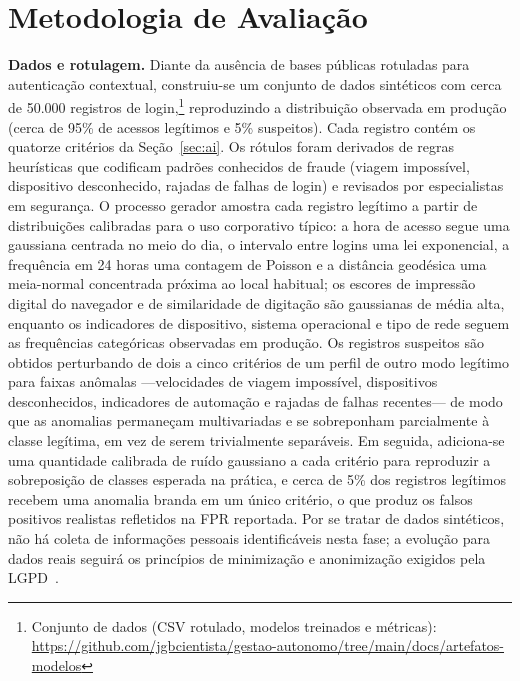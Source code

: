 \documentclass[conference]{IEEEtran}
\begin{document}
\section{Metodologia de Avaliação}
\label{sec:method}
\textbf{Dados e rotulagem.} Diante da ausência de bases públicas
rotuladas para autenticação contextual, construiu-se um conjunto de dados
sintéticos com cerca de 50.000 registros de login,\footnote{Conjunto de dados (CSV rotulado, modelos treinados e métricas): \url{https://github.com/jgbcientista/gestao-autonomo/tree/main/docs/artefatos-modelos}} reproduzindo a
distribuição observada em produção (cerca de 95\% de acessos legítimos e
5\% suspeitos). Cada registro contém os quatorze critérios da
Seção~\ref{sec:ai}. Os rótulos foram derivados de regras heurísticas que
codificam padrões conhecidos de fraude (viagem impossível, dispositivo
desconhecido, rajadas de falhas de login) e revisados por especialistas
em segurança. O processo gerador amostra cada registro legítimo a partir
de distribuições calibradas para o uso corporativo típico: a hora de
acesso segue uma gaussiana centrada no meio do dia, o intervalo entre
logins uma lei exponencial, a frequência em 24 horas uma contagem de
Poisson e a distância geodésica uma meia-normal concentrada próxima ao
local habitual; os escores de impressão digital do navegador e de
similaridade de digitação são gaussianas de média alta, enquanto os
indicadores de dispositivo, sistema operacional e tipo de rede seguem as
frequências categóricas observadas em produção. Os registros suspeitos
são obtidos perturbando de dois a cinco critérios de um perfil de outro
modo legítimo para faixas anômalas ---velocidades de viagem impossível,
dispositivos desconhecidos, indicadores de automação e rajadas de falhas
recentes--- de modo que as anomalias permaneçam multivariadas e se
sobreponham parcialmente à classe legítima, em vez de serem trivialmente
separáveis. Em seguida, adiciona-se uma quantidade calibrada de ruído
gaussiano a cada critério para reproduzir a sobreposição de classes
esperada na prática, e cerca de 5\% dos registros legítimos recebem uma
anomalia branda em um único critério, o que produz os falsos positivos
realistas refletidos na FPR reportada. Por se tratar de dados
sintéticos, não há coleta de
informações pessoais identificáveis nesta fase; a evolução para dados
reais seguirá os princípios de minimização e anonimização exigidos pela
LGPD~\cite{lgpd2018}.
\end{document}
